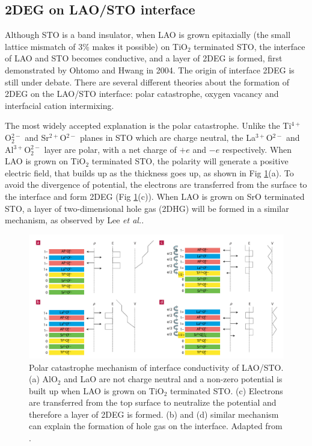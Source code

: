 \documentclass[pdflatex, sectionletters, 12pt]{pittetd}    %
\begin{document}
\subsection{2DEG on LAO/STO interface}

Although STO is a band insulator, when LAO is grown epitaxially (the small lattice mismatch of 3\% makes it possible) on TiO$_2$ terminated STO, the interface of LAO and STO becomes conductive, and a layer of 2DEG is formed, first demonstrated by Ohtomo and Hwang in 2004\cite{ohtomo2004high}. The origin of interface 2DEG is still under debate. There are several different theories about the formation of 2DEG on the LAO/STO interface: polar catastrophe\cite{nakagawa2006some}, oxygen vacancy\cite{kalabukhov2007effect} and interfacial cation intermixing\cite{willmott2007structural}. 

The most widely accepted explanation is the polar catastrophe. Unlike the Ti$^{4+}$O$_2^{2-}$ and Sr$^{2+}$O$^{2-}$ planes in STO which are charge neutral, the La$^{3+}$O$^{2-}$ and Al$^{3+}$O$_2^{2-}$ layer are polar, with a net charge of $+e$ and $-e$ respectively. When LAO is grown on TiO$_2$ terminated STO, the polarity will generate a positive electric field, that builds up as the thickness goes up, as shown in Fig \ref{FIG:PolarCatastrophe}(a). To avoid the divergence of potential, the electrons are transferred from the surface to the interface and form 2DEG (Fig \ref{FIG:PolarCatastrophe}(c)). When LAO is grown on SrO terminated STO, a layer of two-dimensional hole gas (2DHG) will be formed in a similar mechanism, as observed by Lee \textit{et al.}\cite{lee2018direct}.
\\

\begin{figure}[h!]
	\centering
	\includegraphics[width=1.0\textwidth]{Drawing/PolarCatastrophe.pdf}
	\caption{Polar catastrophe mechanism of interface conductivity of LAO/STO. (a) AlO$_2$ and LaO are not charge neutral and a non-zero potential is built up when LAO is grown on TiO$_2$ terminated STO. (c) Electrons are transferred from the top surface to neutralize the potential and therefore a layer of 2DEG is formed. (b) and (d) similar mechanism can explain the formation of hole gas on the interface. Adapted from \cite{nakagawa2006some}.}
	\label{FIG:PolarCatastrophe}
\end{figure}
\end{document}
